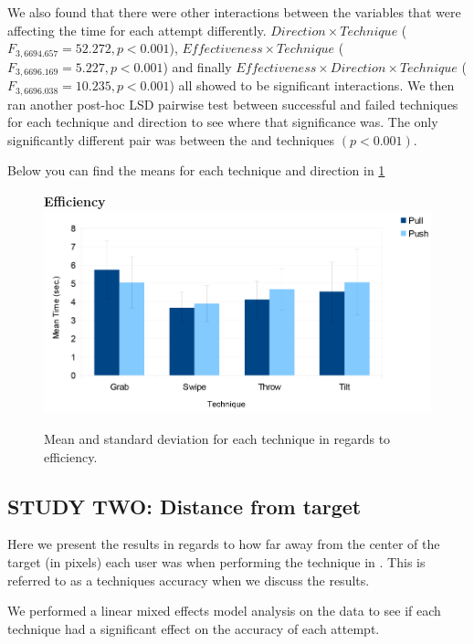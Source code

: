 We also found that there were other interactions between the variables that were affecting the time for each attempt differently. 
$Direction \times Technique$  ($F_{3,6694.657} = 52.272, p < 0.001$), $Effectiveness \times Technique$  ($F_{3,6696.169} = 5.227, p < 0.001$) and finally $Effectiveness \times Direction \times Technique$  ($F_{3,6696.038} = 10.235, p < 0.001$) all showed to be significant interactions. 
We then ran another post-hoc LSD pairwise test between successful and failed techniques for each technique and direction to see where that significance was. 
The only significantly different pair was between the \grab \push and \grab \pull techniques $(p < 0.001)$.

Below you can find the means for each technique and direction in \cref{fig:efficiencyGraph}

\begin{figure}[H]{
	\centering
	\textbf{Efficiency}\\[4pt]
	\includegraphics[width = 1\columnwidth ]{images/time_graph.pdf}} 
	\caption{
		Mean and standard deviation for each technique in regards to efficiency.
	}
	\label{fig:efficiencyGraph}
\end{figure}

\subsection{STUDY TWO: Distance from target}
Here we present the results in regards to how far away from the center of the target (in pixels) each user was when performing the technique in \studytwo. 
This is referred to as a techniques accuracy when we discuss the results. 

We performed a linear mixed effects model analysis on the data to see if each technique had a significant effect on the accuracy of each attempt. 

